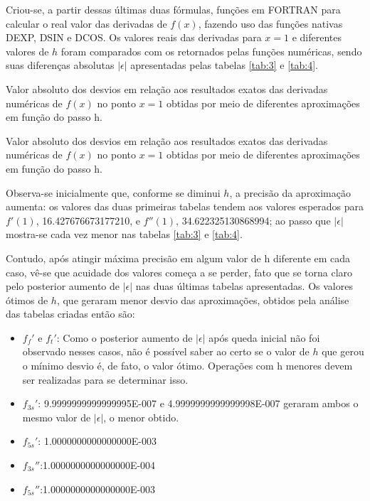 \documentclass{article}
\begin{document}
Criou-se, a partir dessas últimas duas fórmulas, funções em FORTRAN para calcular o real valor das derivadas de $f(x)$, fazendo uso das funções nativas DEXP, DSIN e DCOS. Os valores reais das derivadas para $x=1$ e diferentes valores de $h$ foram comparados com os retornados pelas funções numéricas, sendo suas diferenças absolutas $|\epsilon|$ apresentadas pelas tabelas \ref{tab:3} e \ref{tab:4}.


\begin{table}[h]
  \centering
  
  \caption{Valor absoluto dos desvios em relação aos resultados exatos das derivadas numéricas de $f (x)$ no ponto $x = 1$ obtidas por meio de diferentes aproximações em função do passo h.}
  \label{tab:3}
\end{table}

\begin{table}[h]
  \centering
  
  \caption{Valor absoluto dos desvios em relação aos resultados exatos das derivadas numéricas de $f(x)$ no ponto $x = 1$ obtidas por meio de diferentes aproximações em função do passo h.}
  \label{tab:4}
\end{table}

Observa-se inicialmente que, conforme se diminui $h$, a precisão da aproximação aumenta: os valores das duas primeiras tabelas tendem aos valores esperados para $f'(1)$, 16.427676673177210, e $f''(1)$, 34.622325130868994; ao passo que $|\epsilon|$ mostra-se cada vez menor nas tabelas \ref{tab:3} e \ref{tab:4}.\par
Contudo, após atingir máxima precisão em algum valor de h diferente em cada caso, vê-se que acuidade dos valores começa a se perder, fato que se torna claro pelo posterior aumento de  $|\epsilon|$ nas duas últimas tabelas apresentadas. %
Os valores ótimos de $h$, que geraram menor desvio das aproximações, obtidos pela análise das tabelas criadas então são:

\begin{itemize}
\item $f_f'$ e \(f_t'\): Como o posterior aumento de $|\epsilon|$ após queda inicial não foi observado nesses casos, não é possível saber ao certo se o valor de $h$ que gerou o mínimo desvio é, de fato, o valor ótimo. Operações com h menores devem ser realizadas para se determinar isso.
\item \(f_{3s}'\): 9.9999999999999995E-007 e 4.9999999999999998E-007 geraram ambos o mesmo valor de $|\epsilon|$, o menor obtido.
\item \(f_{5s}'\): 1.0000000000000000E-003
\item \(f_{3s}''\):1.0000000000000000E-004
\item \(f_{5s}''\):1.0000000000000000E-003
\end{itemize}
\end{document}
